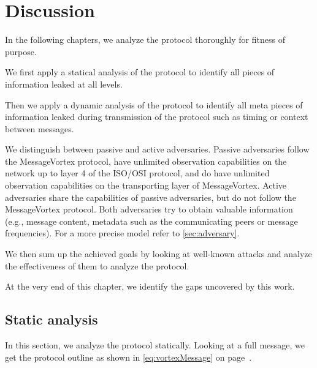 
\part{Discussion \label{sec:discussion}}

In the following chapters, we analyze the protocol thoroughly for fitness of purpose. 

We first apply a statical analysis of the protocol to identify all pieces of information leaked at all levels.

Then we apply a dynamic analysis of the protocol to identify all meta pieces of information leaked during transmission of the protocol such as timing or context between messages.

We distinguish between passive and active adversaries. Passive adversaries follow the MessageVortex protocol, have unlimited observation capabilities on the network up to layer 4 of the ISO/OSI protocol, and do have unlimited observation capabilities on the transporting layer of MessageVortex. Active adversaries share the capabilities of passive adversaries, but do not follow the MessageVortex protocol. Both adversaries try to obtain valuable information (e.g., message content, metadata such as the communicating peers or message frequencies). For a more precise model refer to \ref{sec:adversary}.

We then sum up the achieved goals by looking at well-known attacks and analyze the effectiveness of them to analyze the protocol.

At the very end of this chapter, we identify the gaps uncovered by this work.

\chapter{Static analysis}
In this section, we analyze the protocol statically. Looking at a full message, we get the protocol outline as shown in \eqref{eq:vortexMessage} on page~\pageref{eq:vortexMessage}.

